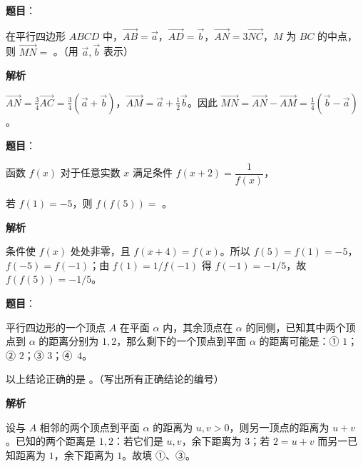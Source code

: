 \begin{answer}

\textbf{题目}：

在平行四边形 $ABCD$ 中，$\overrightarrow{AB}=\vec a$，$\overrightarrow{AD}=\vec b$，$\overrightarrow{AN}=3\overrightarrow{NC}$，$M$ 为 $BC$ 的中点，则 $\overrightarrow{MN}=$ \gkblank{}。（用 $\vec a,\vec b$ 表示）

\textbf{解析}

$\overrightarrow{AN}=\frac34\overrightarrow{AC}=\frac34(\vec a+\vec b)$，$\overrightarrow{AM}=\vec a+\frac12\vec b$。因此 $\overrightarrow{MN}=\overrightarrow{AN}-\overrightarrow{AM}=\frac14(\vec b-\vec a)$。


\end{answer}
\begin{answer}

\textbf{题目}：

函数 $f(x)$ 对于任意实数 $x$ 满足条件 $f(x+2)=\dfrac1{f(x)}$，

若 $f(1)=-5$，则 $f(f(5))=$ \gkblank{}。

\textbf{解析}

条件使 $f(x)$ 处处非零，且 $f(x+4)=f(x)$。所以 $f(5)=f(1)=-5$，$f(-5)=f(-1)$；由 $f(1)=1/f(-1)$ 得 $f(-1)=-1/5$，故 $f(f(5))=-1/5$。


\end{answer}
\begin{answer}

\textbf{题目}：

平行四边形的一个顶点 $A$ 在平面 $\alpha$ 内，其余顶点在 $\alpha$ 的同侧，已知其中两个顶点到 $\alpha$ 的距离分别为 $1,2$，那么剩下的一个顶点到平面 $\alpha$ 的距离可能是：① $1$；② $2$；③ $3$；④~$4$。

以上结论正确的是 \gkblank{}。（写出所有正确结论的编号）

\textbf{解析}

设与 $A$ 相邻的两个顶点到平面 $\alpha$ 的距离为 $u,v>0$，则另一顶点的距离为 $u+v$。已知的两个距离是 $1,2$：若它们是 $u,v$，余下距离为 $3$；若 $2=u+v$ 而另一已知距离为 $1$，余下距离为 $1$。故填 ①、③。


\end{answer}
